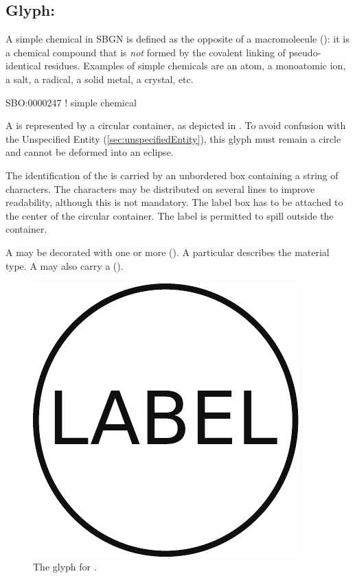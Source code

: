 
\subsection{Glyph: }
\label{sec:simpleChemical}

A simple chemical in SBGN is defined as the opposite of a macromolecule (): it is a chemical compound that is \emph{not} formed by the covalent linking of pseudo-identical residues.  Examples of simple chemicals are an atom, a monoatomic ion, a salt, a radical, a solid metal, a crystal, etc.

\begin{glyphDescription}

\glyphSboTerm SBO:0000247 ! simple chemical

\glyphContainer A  is represented by a circular
container, as depicted in . To avoid confusion
with the Unspecified Entity (\ref{sec:unspecifiedEntity}), this glyph
must remain a circle and cannot be deformed into an eclipse.

\glyphLabel The identification of the  is carried by an unbordered box containing a string of characters.  The characters may be distributed on several lines to improve readability, although this is not mandatory.  The label box has to be attached to the center of the circular container.  The label is permitted to spill outside the container.

\glyphAux A  may be decorated with one or more  ().  A particular  describes the material type.  A  may also carry a  ().

\end{glyphDescription}

\begin{figure}[H]
  \centering
  \includegraphics[scale = 0.3]{images/simpleChemical}
  \caption{The \PD glyph for .}
  \label{fig:simpleChemical}
\end{figure}




